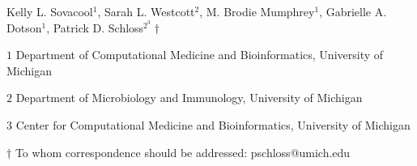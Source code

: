 
\begin{center}
\vspace{25mm}

Kelly L. Sovacool${^1}$, Sarah L. Westcott${^2}$, M. Brodie Mumphrey${^1}$, Gabrielle A. Dotson${^1}$, Patrick D. Schloss${^2^3\dagger}$

$1$ Department of Computational Medicine and Bioinformatics, University of Michigan

$2$ Department of Microbiology and Immunology, University of Michigan

$3$ Center for Computational Medicine and Bioinformatics, University of Michigan

\vspace{30mm}

$\dagger$ To whom correspondence should be addressed: pschloss@umich.edu

\end{center}


\newpage
\linenumbers
